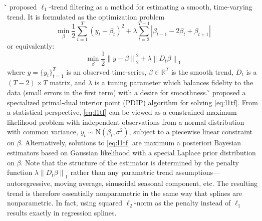 \documentclass[letterpaper]{article} %
\newcommand{\citet}[1]
{\citeauthor{#1} ̃\shortcite{#1}}
\newcommand{\norm}[1]{\left\lVert #1 \right\rVert}
\begin{document}
\citet{KimKoh2009} proposed $\ell_1$-trend filtering as a
method for estimating a smooth, time-varying trend. It is formulated
as the optimization problem 
$$
\min_{\beta} \frac{1}{2} \sum_{t=1}^{T} (y_t-\beta_t)^2+\lambda
\sum_{t=2}^{T-1} \left|\beta_{t-1}-2\beta_{t}+\beta_{t+1}\right| 
$$
or equivalently:
\begin{equation}
\min_{\beta} \frac{1}{2} \norm{ y-\beta }_2^2+\lambda \norm{ D_t \beta}_1
\label{eq:l1tf}
\end{equation}
 where $y=\{y_t\}_{t=1}^T$ is an observed time-series, $\beta\in \mathbb{R}^T$ is the smooth trend,
 $D_t$ is a $(T-2)\times T$ matrix, and $\lambda$ is a tuning parameter
 which balances fidelity to the data (small errors in the first term)
 with a desire for smoothness.  
\citet{KimKoh2009} proposed a specialized primal-dual
interior point (PDIP) algorithm for solving \eqref{eq:l1tf}. From a
statistical perspective, \eqref{eq:l1tf} can be viewed as a constrained maximum
likelihood problem with independent observations from a normal
distribution with common variance, $y_t \sim \mbox{N}(\beta_t,
\sigma^2)$, subject to a piecewise linear constraint on
$\beta$. Alternatively, solutions to \eqref{eq:l1tf} are %
maximum a posteriori Bayesian estimators based on Gaussian likelihood
with a special Laplace prior distribution on $\beta$. Note that the
structure of the estimator is determined by the penalty function
$\lambda\norm{D_t\beta}_1$ rather than any parametric trend
assumptions---autoregressive, moving average, sinusoidal seasonal
component, etc. The resulting trend is therefore essentially
nonparametric in the same way that splines are nonparametric. In fact,
using squared $\ell_2$-norm as the penalty instead of $\ell_1$ results exactly in
regression splines.
\end{document}
